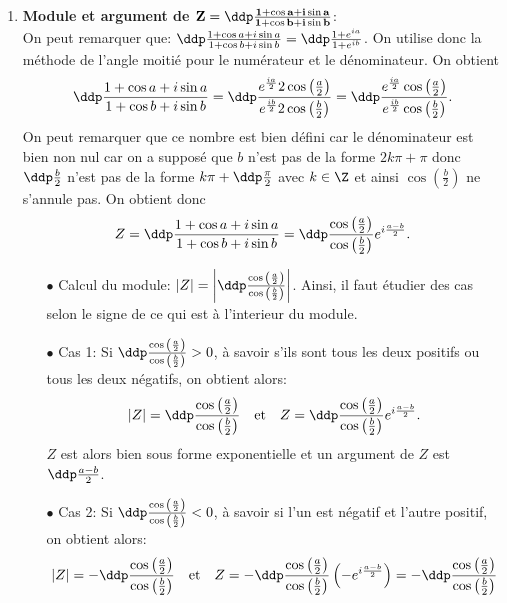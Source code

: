 \begin{correction}   \;
\begin{enumerate}
\item \textbf{Module et argument de $\mathbf{Z=\ddp\frac{1+\cos{a}+i\sin{a}  }{ 1+\cos{b}+i\sin{b}  }}$}:\\
On peut remarquer que: $\ddp\frac{1+\cos{a}+i\sin{a}  }{ 1+\cos{b}+i\sin{b}  }= \ddp\frac{ 1+e^{ia}  }{1+e^{ib}}$. On utilise donc la m\'ethode de l'angle moiti\'e pour le num\'erateur et le d\'enominateur. On obtient
$$\ddp\frac{1+\cos{a}+i\sin{a}  }{ 1+\cos{b}+i\sin{b}  }= \ddp\frac{ e^{\frac{ia}{2}}   2\cos{\left( \frac{a}{2}\right)}  }{ e^{\frac{ib}{2}}   2\cos{\left( \frac{b}{2}\right)}   }=\ddp\frac{ e^{\frac{ia}{2}}   \cos{\left( \frac{a}{2}\right)}  }{ e^{\frac{ib}{2}}   \cos{\left( \frac{b}{2}\right)}   }.$$
On peut remarquer que ce nombre est bien d\'efini car le d\'enominateur est bien non nul car on a suppos\'e que $b$ n'est pas de la forme $2k\pi+\pi$ donc $\ddp\frac{b}{2}$ n'est pas de la forme $k\pi+\ddp\frac{\pi}{2}$ avec $k\in\Z$ et ainsi $\cos{\left( \frac{b}{2}\right)} $ ne s'annule pas. On obtient donc
$$Z=\ddp\frac{1+\cos{a}+i\sin{a}  }{ 1+\cos{b}+i\sin{b}  }=\ddp\frac{ \cos{\left( \frac{a}{2}\right)}  }{   \cos{\left( \frac{b}{2}\right)}  } e^{i\frac{a-b}{2}}.$$
\begin{itemize}
\item[$\bullet$] Calcul du module: $|Z|= \left| \ddp\frac{ \cos{\left( \frac{a}{2}\right)}  }{   \cos{\left( \frac{b}{2}\right)}  }   \right|$. Ainsi, il faut \'etudier des cas selon le signe de ce qui est \`{a} l'interieur du module.
\item[$\bullet$] Cas 1: Si $ \ddp\frac{ \cos{\left( \frac{a}{2}\right)}  }{   \cos{\left( \frac{b}{2}\right)}  } >0$, \`{a} savoir s'ils sont tous les deux positifs ou tous les deux n\'egatifs, on obtient alors:
$$|Z|=\ddp\frac{ \cos{\left( \frac{a}{2}\right)}  }{   \cos{\left( \frac{b}{2}\right)}  } \quad \hbox{et}\quad Z=\ddp\frac{ \cos{\left( \frac{a}{2}\right)}  }{   \cos{\left( \frac{b}{2}\right)}  } e^{i\frac{a-b}{2}}.$$
$Z$ est alors bien sous forme exponentielle et un argument de $Z$ est $\ddp\frac{a-b}{2}$.
\item[$\bullet$] Cas 2: Si $ \ddp\frac{ \cos{\left( \frac{a}{2}\right)}  }{   \cos{\left( \frac{b}{2}\right)}  } <0$, \`{a} savoir si l'un est n\'egatif et l'autre positif, on obtient alors:
$$|Z|=-\ddp\frac{ \cos{\left( \frac{a}{2}\right)}  }{   \cos{\left( \frac{b}{2}\right)}  } \quad \hbox{et}\quad Z=-\ddp\frac{ \cos{\left( \frac{a}{2}\right)}  }{   \cos{\left( \frac{b}{2}\right)}  } \left(-e^{i\frac{a-b}{2}}\right)=-\ddp\frac{ \cos{\left( \frac{a}{2}\right)}  }{   \cos{\left( \frac{b}{2}\right)}  } 
$$
\end{itemize}
\end{enumerate}
\end{correction}
